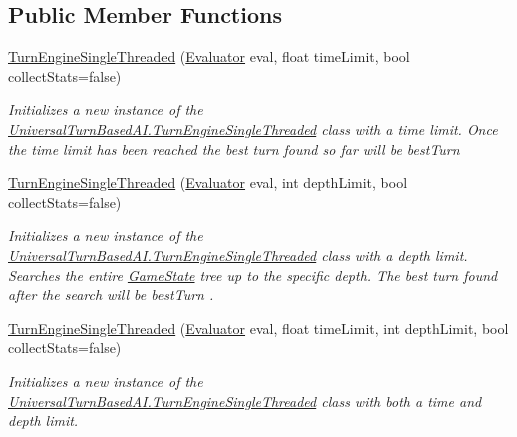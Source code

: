 \subsection*{Public Member Functions}
\begin{DoxyCompactItemize}
\item 
\hyperlink{class_universal_turn_based_a_i_1_1_turn_engine_single_threaded_a0c58e0d032bc0ae478d4cc2c81f08b5a}{Turn\+Engine\+Single\+Threaded} (\hyperlink{class_universal_turn_based_a_i_1_1_evaluator}{Evaluator} eval, float time\+Limit, bool collect\+Stats=false)
\begin{DoxyCompactList}\small\item\em Initializes a new instance of the \hyperlink{class_universal_turn_based_a_i_1_1_turn_engine_single_threaded}{Universal\+Turn\+Based\+A\+I.\+Turn\+Engine\+Single\+Threaded} class with a time limit. Once the time limit has been reached the best turn found so far will be {\itshape best\+Turn}  \end{DoxyCompactList}\item 
\hyperlink{class_universal_turn_based_a_i_1_1_turn_engine_single_threaded_a5e3a9b73de9ae9436216d16c24035162}{Turn\+Engine\+Single\+Threaded} (\hyperlink{class_universal_turn_based_a_i_1_1_evaluator}{Evaluator} eval, int depth\+Limit, bool collect\+Stats=false)
\begin{DoxyCompactList}\small\item\em Initializes a new instance of the \hyperlink{class_universal_turn_based_a_i_1_1_turn_engine_single_threaded}{Universal\+Turn\+Based\+A\+I.\+Turn\+Engine\+Single\+Threaded} class with a depth limit. Searches the entire \hyperlink{class_universal_turn_based_a_i_1_1_game_state}{Game\+State} tree up to the specific depth. The best turn found after the search will be {\itshape best\+Turn} . \end{DoxyCompactList}\item 
\hyperlink{class_universal_turn_based_a_i_1_1_turn_engine_single_threaded_a232b6e64b5d9633bbbc4f90db52a0c67}{Turn\+Engine\+Single\+Threaded} (\hyperlink{class_universal_turn_based_a_i_1_1_evaluator}{Evaluator} eval, float time\+Limit, int depth\+Limit, bool collect\+Stats=false)
\begin{DoxyCompactList}\small\item\em Initializes a new instance of the \hyperlink{class_universal_turn_based_a_i_1_1_turn_engine_single_threaded}{Universal\+Turn\+Based\+A\+I.\+Turn\+Engine\+Single\+Threaded} class with both a time and depth limit. \end{DoxyCompactList}\end{DoxyCompactItemize}
